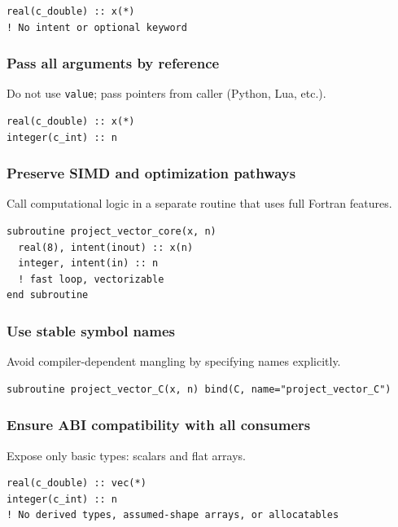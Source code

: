 \documentclass{article}
\begin{document}
\begin{verbatim}
real(c_double) :: x(*)
! No intent or optional keyword
\end{verbatim}

\subsubsection{Pass all arguments by reference}

Do not use \texttt{value}; pass pointers from caller (Python, Lua, etc.).

\begin{verbatim}
real(c_double) :: x(*)
integer(c_int) :: n
\end{verbatim}

\subsubsection{Preserve SIMD and optimization pathways}

Call computational logic in a separate routine that uses full Fortran features.

\begin{verbatim}
subroutine project_vector_core(x, n)
  real(8), intent(inout) :: x(n)
  integer, intent(in) :: n
  ! fast loop, vectorizable
end subroutine
\end{verbatim}

\subsubsection{Use stable symbol names}

Avoid compiler-dependent mangling by specifying names explicitly.

\begin{verbatim}
subroutine project_vector_C(x, n) bind(C, name="project_vector_C")
\end{verbatim}

\subsubsection{Ensure ABI compatibility with all consumers}

Expose only basic types: scalars and flat arrays.

\begin{verbatim}
real(c_double) :: vec(*)
integer(c_int) :: n
! No derived types, assumed-shape arrays, or allocatables
\end{verbatim}
\end{document}
